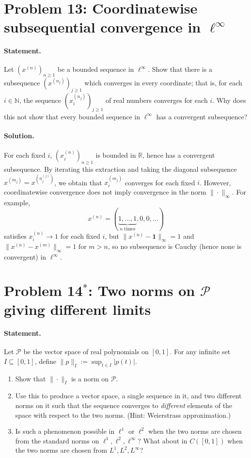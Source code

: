 \documentclass[12pt,a4paper]{article}
\theoremstyle{plain}
\theoremstyle{definition}
\theoremstyle{remark}
\theoremstyle{remark}
\begin{document}
\section*{Problem 13: Coordinatewise subsequential convergence in $\ell^\infty$}

\paragraph{Statement.}
Let $(x^{(n)})_{n\ge1}$ be a bounded sequence in $\ell^\infty$.
Show that there is a subsequence $(x^{(n_j)})_{j\ge1}$ which converges in every coordinate; that is,
for each $i\in\mathbb{N}$, the sequence $(x^{(n_j)}_i)_{j\ge1}$ of real numbers converges for each $i$.
Why does this not show that every bounded sequence in $\ell^\infty$ has a convergent subsequence?

\paragraph{Solution.}
For each fixed $i$, $(x^{(n)}_i)_{n\ge1}$ is bounded in $\mathbb{R}$, hence has a convergent subsequence.
By iterating this extraction and taking the diagonal subsequence $x^{(m_j)}=x^{(n^{(j)}_j)}$,
we obtain that $x^{(m_j)}_i$ converges for each fixed $i$.
However, coordinatewise convergence does not imply convergence in the norm $\|\cdot\|_\infty$.
For example,
\[
x^{(n)}=(\underbrace{1,\dots,1}_{n\text{ times}},0,0,\dots)
\]
satisfies $x^{(n)}_i\to 1$ for each fixed $i$, but
$\|x^{(n)}-\mathbf{1}\|_\infty=1$ and $\|x^{(n)}-x^{(m)}\|_\infty=1$ for $m>n$,
so no subsequence is Cauchy (hence none is convergent) in $\ell^\infty$.

\bigskip
\section*{Problem 14$^*$: Two norms on $\mathcal{P}$ giving different limits}

\paragraph{Statement.}
Let $\mathcal{P}$ be the vector space of real polynomials on $[0,1]$.  
For any infinite set $I\subseteq[0,1]$, define $\|p\|_{I}:=\sup_{t\in I}|p(t)|$.
\begin{enumerate}
	\item[(a)] Show that $\|\cdot\|_{I}$ is a norm on $\mathcal{P}$.
	\item[(b)] Use this to produce a vector space, a single sequence in it, and two different norms on it
	such that the sequence converges to \emph{different} elements of the space with respect to the two norms.
	(Hint: Weierstrass approximation.)
	\item[(c)] Is such a phenomenon possible in $\ell^1$ or $\ell^2$ when the two norms are chosen
	from the standard norms on $\ell^1,\ell^2,\ell^\infty$?  
	What about in $C([0,1])$ when the two norms are chosen from $L^1,L^2,L^\infty$?
\end{enumerate}
\end{document}
